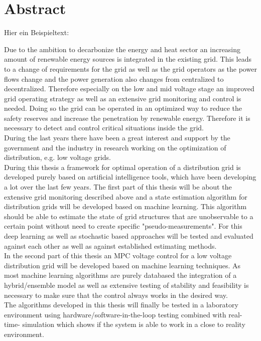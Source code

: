 
\chapter*{Abstract}   \label{cha:Abstract}

Hier ein Beispieltext:

Due to the ambition to decarbonize the energy and heat sector an increasing amount of renewable energy sources is integrated in the existing grid. This leads to a change of requirements for the grid as well as the grid operators as the power flows change and the power generation also changes from centralized to decentralized. Therefore especially on the low and mid voltage stage an improved grid operating strategy as well as an extensive grid monitoring and control is needed. Doing so the grid can be operated in an optimized way to reduce the safety reserves and increase the penetration by renewable energy. Therefore it is necessary to detect and control critical situations inside the grid.\\
During the last years there have been a great interest and support by the government and the industry in research working on the optimization of distribution, e.g. low voltage grids.\\
During this thesis a framework for optimal operation of a distribution grid is developed purely based on artificial intelligence tools, which have been developing a lot over the last few years. The first part of this thesis will be about the extensive grid monitoring described above and a state estimation algorithm for distribution grids will be developed based on machine learning. This algorithm should be able to estimate the state of grid structures that are unobservable to a certain point without need to create specific "pseudo-measurements". For this deep learning as well as stochastic based approaches will be tested and evaluated against each other as well as against established estimating methods.\\
In the second part of this thesis an MPC voltage control for a low voltage distribution grid will be developed based on machine learning techniques. As most machine learning algorithms are purely databased the integration of a hybrid/ensemble model as well as extensive testing of stability and feasibility is necessary to make sure that the control always works in the desired way.\\
The algorithms developed in this thesis will finally be tested in a laboratory environment using hardware/software-in-the-loop testing combined with real-time- simulation which shows if the system is able to work in a close to reality environment.   